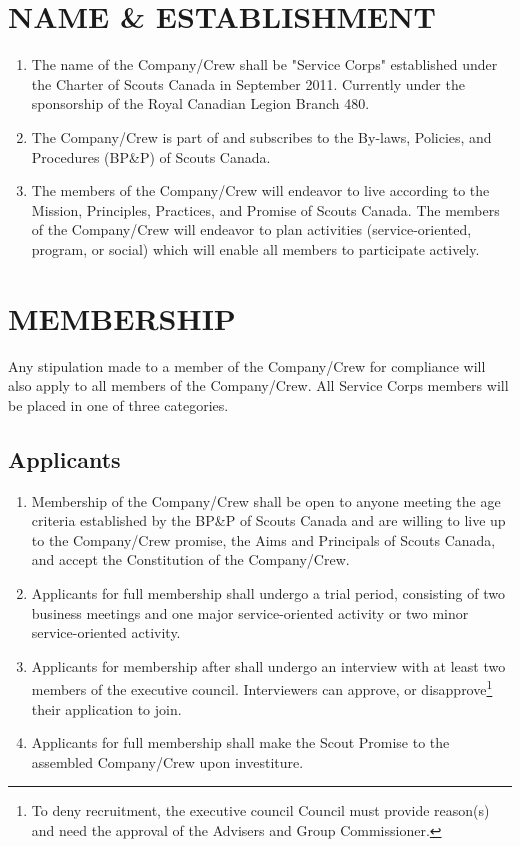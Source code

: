 \documentclass{Service_Corps_Document}
\begin{document}
\def \Title {Constitution}
\def \Company {Service Corps}
\def \versionNumber {4.0}
\stdFooter
\begin{titlepage}
	\stdTitlePage
\end{titlepage}

\tableofcontents	
		
\newpage
\section{NAME \& ESTABLISHMENT}
\begin{enumerate}
	\item The name of the Company/Crew shall be "Service Corps" established under the Charter of Scouts Canada in September 2011. Currently under the sponsorship of the Royal Canadian Legion Branch 480.
	\item The Company/Crew is part of and subscribes to the By-laws, Policies, and Procedures (BP\&P) of Scouts Canada.
	\item The members of the Company/Crew will endeavor to live according to the Mission, Principles, Practices, and Promise of Scouts Canada. The members of the Company/Crew will endeavor to plan activities (service-oriented, program, or social) which will enable all members to participate actively.
\end{enumerate}	
\section{MEMBERSHIP}
Any stipulation made to a member of the Company/Crew for compliance will also apply to all members of the Company/Crew. All Service Corps members will be placed in one of three categories.
\subsection{Applicants}
\begin{enumerate}
	\item Membership of the Company/Crew shall be open to anyone meeting the age criteria established by the BP\&P of Scouts Canada and are willing to live up to the Company/Crew promise, the Aims and Principals of Scouts Canada, and accept the Constitution of the Company/Crew. 
	\item Applicants for full membership shall undergo a trial period, consisting of two business meetings and one major service-oriented activity or two minor service-oriented activity.
	\item Applicants for membership after shall undergo an interview with at least two members of the executive council. Interviewers can approve, or disapprove\footnote{To deny recruitment, the executive council Council must provide reason(s) and need the approval of the Advisers and Group Commissioner.} their application to join.
	\item Applicants for full membership shall make the Scout Promise to the assembled Company/Crew upon investiture. 
\end{enumerate}
\end{document}
